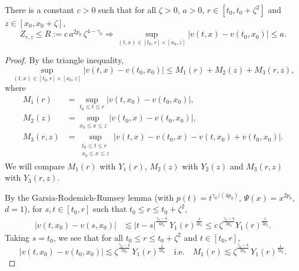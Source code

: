 \documentclass[12pt,a4paper]{article}
\newcommand {\deltah}{{\zeta}}
\newcommand{\<}{\langle}
\renewcommand{\>}{\rangle}
\begin{document}
\begin{proposition}\label{rd04_03p1}
There is a constant $ c>0$ such that for all $\deltah > 0$, $a>0$, $r\in [t_0,t_0+\deltah^2]$ and $z\in [x_0,x_0+\deltah]$,
 \begin{equation} \label{R}
 Z_{r,z} \le R:=c\,a^{2p_0}\, \deltah^{4-\gamma_0}  \Longrightarrow
 \sup_{(t,x)\in [t_0,r] \times [x_0, z]} |v(t,x)-v(t_0,x_0)| \le a.
 \end{equation}
\end{proposition}
 
 \begin{proof}
 By the triangle inequality,  
\begin{equation} \label{a1}
   \sup_{(t,x)\in [t_0,r] \times [x_0, z]} |v(t,x)-v(t_0,x_0)|  \le M_1(r)+M_2(z) +M_3(r, z),
\end{equation}
 where
\begin{align*}
M_1(r) &=   \sup_{t_0\le t \le r } \vert v(t,x_0)-v(t_0,x_0)\vert,   \\
M_2(z) &=    \sup _{x_0\le x \le z} \vert v(t_0,x)-v(t_0,x_0)\vert, \\
M_3(r, z) &= \sup _{\substack {t_0\le t \le r \\ x_0\le x \le z}} \vert v(t,x)-v(t_0,x)-v(t,x_0)+v(t_0,x_0)\vert.
\end{align*}
We will compare $M_1(r)$ with $Y_1(r)$, $M_2(z)$ with $Y_2(z)$ and $M_3(r, z)$ with $Y_3(r, z)$.

By the Garsia-Rodemich-Rumsey lemma \cite[Lemma A.3.1]{nualart2006} (with $p(t) = t^{\gamma_0/(4 p_0)}$, $\Psi(x) = x^{2 p_0}$, $d=1$), for $s,t\in [t_0,r]$ such that $t_0\le r\le t_0+\deltah^2$,
\begin{align*}
|v(t,x_0)-v(s,x_0)| & \lesssim |t-s|^{\frac {\gamma_0-4}{4p_0} } \, Y_1(r) ^{\frac 1{2p_0}} \le c\, \deltah^{\frac {\gamma_0-4}{2p_0} }
Y_1(r)^{\frac 1{2p_0}}.
\end{align*}
Taking $s=t_0$, we see that for all $t_0 \leq r \le t_0+\deltah^2$ and  $t\in [t_0,r]$,
   \begin{equation} \label{EQ2}
|v(t,x_0)-v(t_0,x_0)| \lesssim \deltah^{\frac {\gamma_0-4}{2p_0} } \,Y_1(r) ^{\frac 1{2p_0}}\quad\text{i.e.}\quad M_1(r) \lesssim \deltah^{\frac {\gamma_0-4}{2p_0} } \,Y_1(r) ^{\frac 1{2p_0}}.
\end{equation}
 


\end{proof}
\end{document}
